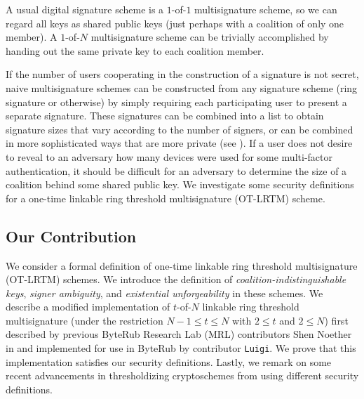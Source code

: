 \documentclass{mrl}
\theoremstyle{definition}
\begin{document}
A usual digital signature scheme is a $1$-of-$1$ multisignature scheme, so we can regard all keys as shared public keys (just perhaps with a coalition of only one member). A $1$-of-$N$ multisignature scheme can be trivially accomplished by handing out the same private key to each coalition member. 

If the number of users cooperating in the construction of a signature is not secret, naive multisignature schemes can be constructed from any signature scheme (ring signature or otherwise) by simply requiring each participating user to present a separate signature. These signatures can be combined into a list to obtain signature sizes that vary according to the number of signers, or can be combined in more sophisticated ways that are more private (see \cite{bonehthreshold}).  If a user does not desire to reveal to an adversary how many devices were used for some multi-factor authentication, it should be difficult for an adversary to determine the size of a coalition behind some shared public key. We investigate some security definitions for a one-time linkable ring threshold multisignature (OT-LRTM) scheme.





\subsection{Our Contribution}


We consider a formal definition of one-time linkable ring threshold multisignature (OT-LRTM) schemes. We introduce the definition of \textit{coalition-indistinguishable keys}, \textit{signer ambiguity}, and \textit{existential unforgeability} in these schemes. We describe a modified implementation of $t$-of-$N$ linkable ring threshold multisignature (under the restriction $N-1 \leq t \leq N$ with $2 
\leq t$ and $2 \leq N$) first described by previous ByteRub Research Lab (MRL) contributors Shen Noether in \cite{noether2016ring} and implemented for use in ByteRub by contributor \texttt{Luigi}. We prove that this implementation satisfies our security definitions. Lastly, we remark on some recent advancements in thresholdizing cryptoschemes from \cite{bonehthreshold} using different security definitions.
\end{document}
